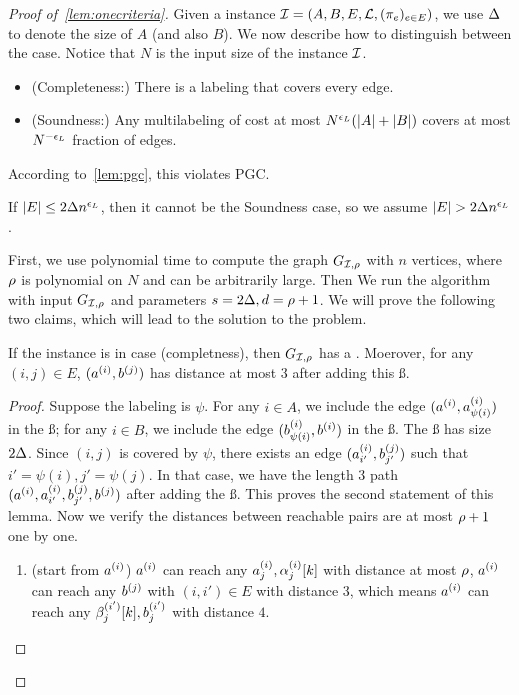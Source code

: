\begin{proof}[Proof of~\cref{lem:onecriteria}]
	Given a \labcov{} instance $\mathcal{I}=(A,B,E,\mathcal{L},(\pi_e)_{e\in E})$, we use $\Delta$ to denote the size of $A$ (and also $B$). We now describe how to distinguish between the case. Notice that $N$ is the input size of the \labcov{} instance $\mathcal{I}$.
	\begin{itemize}
		
		\item (Completeness:) There is a labeling that covers every edge. 
		
		\item (Soundness:) Any multilabeling of cost at most $N^{\epsilon_{L}{}}(|A|+|B|)$ covers at most $N^{-\epsilon_{L}{}}$ fraction of edges.             
	\end{itemize}
	According to~\cref{lem:pgc}, this violates PGC. 
	
	If $|E|\le 2\Delta n^{\epsilon_{L}}$, then it cannot be the Soundness case, so we assume $|E|>2\AB n^{\epsl}$. 
	
	First, we use polynomial time to compute the \labcov{} graph $G_{\mathcal{I},\mathcal{\rho}{}}$ with $n$ vertices, where $\mathcal{\rho}{}$ is polynomial on $N$ and can be arbitrarily large. 
	Then We run the  algorithm with input $G_{\mathcal{I},\mathcal{\rho}{}}$ and parameters $s=2\Delta,d=\mathcal{\rho}{}+1$. We will prove the following two claims, which will lead to the solution to the \labcov{} problem.
	\begin{claim}\label{clai:caseI}
		If the \labcov{} instance is in case (completness), then $G_{\mathcal{I},\mathcal{\rho}{}}$ has a . Moerover, for any $(i,j)\in E$, $(a^{(i)},b^{(j)})$ has distance at most $3$ after adding this \ss{}. 
	\end{claim}
	\begin{proof}
		Suppose the labeling is $\psi$. For any $i\in A$, we include the edge $(a^{(i)},a^{(i)}_{\psi(i)})$ in the \ss{}; for any $i\in B$, we include the edge $(b^{(i)}_{\psi(i)},b^{(i)})$ in the \ss{}. The \ss{} has size $2\Delta $. Since $(i,j)$ is covered by $\psi$, there exists an edge $(a^{(i)}_{i'},b^{(j)}_{j'})$ such that $i'=\psi(i),j'=\psi(j)$. In that case, we have the length 3 path $(a^{(i)},a^{(i)}_{i'},b^{(j)}_{j'},b^{(j)})$ after adding the \ss{}. This proves the second statement of this lemma. Now we verify the distances between reachable pairs are at most $\mathcal{\rho}{}+1$ one by one.
		\begin{enumerate}
			\item (start from $a^{(i)}$) $a^{(i)}$ can reach any $a^{(i)}_{j},\alpha^{(i)}_{j}[k]$ with distance at most $\mathcal{\rho}{}$, $a^{(i)}$ can reach any $b^{(j)}$ with $(i,i')\in E$ with distance $3$, which means $a^{(i)}$ can reach any $\beta^{(i')}_{j}[k],b^{(i')}_{j}$ with distance $4$.
			

\end{enumerate}
\end{proof}
\end{proof}
